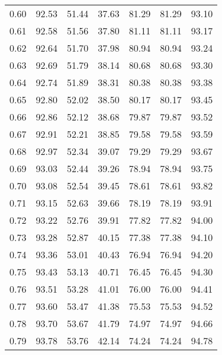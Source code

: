 \begin{tabular}{|c|c|c|c|c|c|c|}
      0.60 &     92.53 &     51.44 &      37.63 &   81.29 &      81.29 &         93.10 \\
      0.61 &     92.58 &     51.56 &      37.80 &   81.11 &      81.11 &         93.17 \\
      0.62 &     92.64 &     51.70 &      37.98 &   80.94 &      80.94 &         93.24 \\
      0.63 &     92.69 &     51.79 &      38.14 &   80.68 &      80.68 &         93.30 \\
      0.64 &     92.74 &     51.89 &      38.31 &   80.38 &      80.38 &         93.38 \\
      0.65 &     92.80 &     52.02 &      38.50 &   80.17 &      80.17 &         93.45 \\
      0.66 &     92.86 &     52.12 &      38.68 &   79.87 &      79.87 &         93.52 \\
      0.67 &     92.91 &     52.21 &      38.85 &   79.58 &      79.58 &         93.59 \\
      0.68 &     92.97 &     52.34 &      39.07 &   79.29 &      79.29 &         93.67 \\
      0.69 &     93.03 &     52.44 &      39.26 &   78.94 &      78.94 &         93.75 \\
      0.70 &     93.08 &     52.54 &      39.45 &   78.61 &      78.61 &         93.82 \\
      0.71 &     93.15 &     52.63 &      39.66 &   78.19 &      78.19 &         93.91 \\
      0.72 &     93.22 &     52.76 &      39.91 &   77.82 &      77.82 &         94.00 \\
      0.73 &     93.28 &     52.87 &      40.15 &   77.38 &      77.38 &         94.10 \\
      0.74 &     93.36 &     53.01 &      40.43 &   76.94 &      76.94 &         94.20 \\
      0.75 &     93.43 &     53.13 &      40.71 &   76.45 &      76.45 &         94.30 \\
      0.76 &     93.51 &     53.28 &      41.01 &   76.00 &      76.00 &         94.41 \\
      0.77 &     93.60 &     53.47 &      41.38 &   75.53 &      75.53 &         94.52 \\
      0.78 &     93.70 &     53.67 &      41.79 &   74.97 &      74.97 &         94.66 \\
      0.79 &     93.78 &     53.76 &      42.14 &   74.24 &      74.24 &         94.78 \\

\end{tabular}
